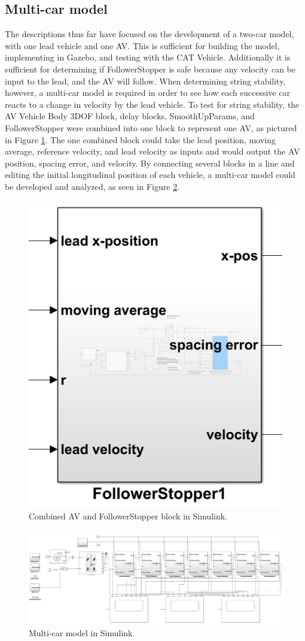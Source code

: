 \documentclass[conference]{IEEEtran}
\begin{document}
\subsection{Multi-car model}
The descriptions thus far have focused on the development of a two-car model, with one lead vehicle and one AV. This is sufficient for building the model, implementing in Gazebo, and testing with the CAT Vehicle. Additionally it is sufficient for determining if FollowerStopper is safe because any velocity can be input to the lead, and the AV will follow. When determining string stability, however, a multi-car model is required in order to see how each successive car reacts to a change in velocity by the lead vehicle. To test for string stability, the AV Vehicle Body 3DOF block, delay blocks, SmoothUpParams, and FollowerStopper were combined into one block to represent one AV, as pictured in Figure \ref{multicarmodel1}. The one combined block could take the lead position, moving average, reference velocity, and lead velocity as inputs and would output the AV position, spacing error, and velocity. By connecting several blocks in a line and editing the initial longitudinal position of each vehicle, a multi-car model could be developed and analyzed, as seen in Figure \ref{multicarmodel2}.

\begin{figure}[htbp]
\centerline{\includegraphics[width=2 in]{7carmodelblock.PNG}}
\caption{Combined AV and FollowerStopper block in Simulink.}
\label{multicarmodel1}
\end{figure}

\begin{figure}[htbp]
\centerline{\includegraphics[width=3.5 in]{7carmodel.PNG}}
\caption{Multi-car model in Simulink.}
\label{multicarmodel2}
\end{figure}
\end{document}
